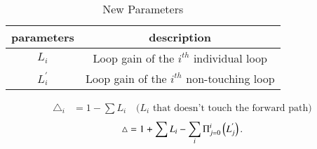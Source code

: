 \begin{enumerate}[label=\thechapter.\arabic*,ref=\thechapter.\theenumi]
\begin{table}[!ht]
\begin{tabular}{|c|c|}
	\hline
	\textbf{parameters} & \textbf{description}\\
	\hline
	$L_i$ & Loop gain of the $i^{th}$ individual loop\\
	\hline
	$L^{'}_i$ & Loop gain of the $i^{th}$ non-touching loop\\
	\hline
\end{tabular}
\caption{New Parameters}
\end{table}
\begin{align}
\triangle_i &= 1 - \sum{L_i} \quad \text{($L_i$ that doesn't touch the forward path)}
\end{align}
\begin{align}
\triangle = 1 + \sum L_i - \sum_i \Pi_{j=0}^i \left(L^{'}_j\right) .
\end{align}
\end{enumerate}

